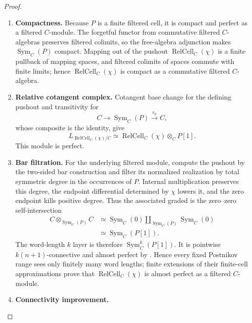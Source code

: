 \begin{proof}
\leavevmode
\begin{enumerate}[label=\textup{(\arabic*)}]
    \item \textbf{Compactness.}
    Because \(P\) is a finite filtered cell, it is compact and perfect as a
    filtered \(C\)-module. The forgetful functor from commutative filtered
    \(C\)-algebras preserves filtered colimits, so the free-algebra adjunction
    makes \(\operatorname{Sym}_C(P)\) compact. Mapping out of the pushout
    \(\operatorname{RelCell}_C(\chi)\) is a finite pullback of mapping spaces, and filtered colimits of
    spaces commute with finite limits; hence \(\operatorname{RelCell}_C(\chi)\) is compact as a
    commutative filtered \(C\)-algebra.
    \item \textbf{Relative cotangent complex.}
    Cotangent base change for the defining pushout and transitivity for
    \[
        C\longrightarrow\operatorname{Sym}_C(P)
        \xrightarrow{\epsilon_0}C,
    \]
    whose composite is the identity, give
    \[
        L_{\operatorname{RelCell}_C(\chi)/C}
        \simeq
        \operatorname{RelCell}_C(\chi)\otimes_C P[1].
    \]
    This module is perfect.
    \item \textbf{Bar filtration.}
    For the underlying filtered module, compute the pushout by the two-sided bar
    construction and filter its normalized realization by total symmetric degree
    in the occurrences of \(P\). Internal multiplication preserves this degree,
    the endpoint differential determined by \(\chi\) lowers it, and the zero
    endpoint kills positive degree. Thus the associated graded is the zero--zero
    self-intersection
    \[
    \begin{aligned}
        C\otimes_{\operatorname{Sym}_C(P)}C
        &\simeq
        \operatorname{Sym}_C(0)
        \amalg_{\operatorname{Sym}_C(P)}
        \operatorname{Sym}_C(0)\\
        &\simeq
        \operatorname{Sym}_C(P[1]).
    \end{aligned}
    \]
    The word-length \(k\) layer is therefore
    \(\operatorname{Sym}^k_C(P[1])\). It is pointwise
    \(k(n+1)\)-connective and almost perfect by
    . Hence every fixed Postnikov
    range sees only finitely many word lengths; finite extensions of their
    finite-cell approximations prove that \(\operatorname{RelCell}_C(\chi)\) is almost perfect as a
    filtered \(C\)-module.
    \item \textbf{Connectivity improvement.}

\end{enumerate}
\end{proof}
